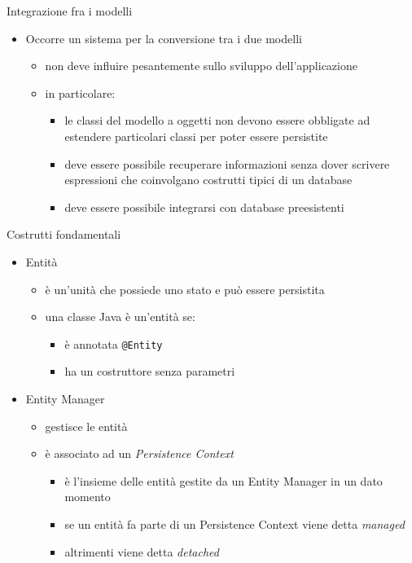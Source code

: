 \begin{frame}{Integrazione fra i modelli}

\begin{itemize}
\item Occorre un sistema per la conversione tra i due modelli

	\begin{itemize}
	\item non deve influire pesantemente sullo sviluppo dell'applicazione
	\item in particolare:
	
		\begin{itemize}
		\item le classi del modello a oggetti non devono essere obbligate ad estendere particolari classi per poter essere persistite
		\item deve essere possibile recuperare informazioni senza dover scrivere espressioni che coinvolgano costrutti tipici di un database
		\item deve essere possibile integrarsi con database preesistenti
		\end{itemize}
	
	\end{itemize}

\end{itemize}

\end{frame}


\begin{frame}{Costrutti fondamentali}

\begin{itemize}
\item Entità
	\begin{itemize}
	\item è un'unità che possiede uno stato e può essere persistita
	\item una classe Java è un'entità se:
		\begin{itemize}
		\item è annotata \texttt{@Entity}
		\item ha un costruttore senza parametri
		\end{itemize}
	\end{itemize}

\item Entity Manager
	\begin{itemize}
	\item gestisce le entità
	\item è associato ad un \textsl{Persistence Context}
		\begin{itemize}
		\item è l'insieme delle entità gestite da un Entity Manager in un dato momento
		\item se un entità fa parte di un Persistence Context viene detta \textsl{managed}
		\item altrimenti viene detta \textsl{detached}
		\end{itemize}
	\end{itemize}

\end{itemize}	


\end{frame}

